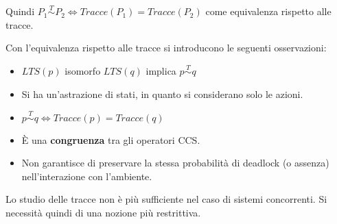 \begin{definizione}
    Quindi $P_1 \stackrel{T}{\sim} P_2 \iff Tracce(P_1) = Tracce(P_2)$ come
    equivalenza rispetto alle tracce.
\end{definizione}
\begin{osservazione}
    Con l'equivalenza rispetto alle tracce si introducono le seguenti osservazioni:
    \begin{itemize}
        \item $LTS(p)$ isomorfo $LTS(q)$ implica $p \stackrel{T}{\sim} q$
        \item Si ha un'astrazione di stati, in quanto si considerano solo le azioni.
        \item $p \stackrel{T}{\sim} q \iff Tracce(p) = Tracce(q)$
        \item È una \textbf{congruenza} tra gli operatori CCS.
        \item Non garantisce di preservare la stessa probabilità di deadlock (o
              assenza) nell'interazione con l'ambiente.
    \end{itemize}
\end{osservazione}
Lo studio delle tracce non è più sufficiente nel caso di sistemi concorrenti.
Si necessità quindi di una nozione più restrittiva.
